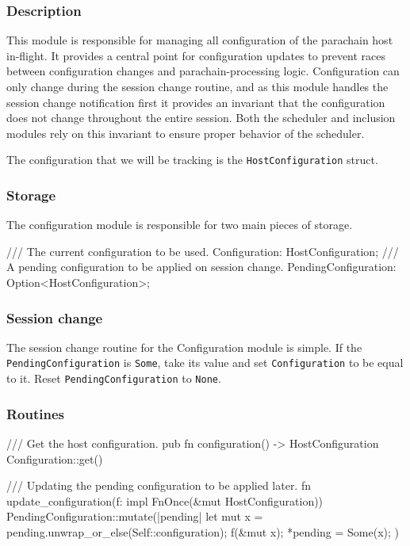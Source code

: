 \subsubsection{Description}

This module is responsible for managing all configuration of the parachain host
in-flight. It provides a central point for configuration updates to prevent
races between configuration changes and parachain-processing logic.
Configuration can only change during the session change routine, and as this
module handles the session change notification first it provides an invariant
that the configuration does not change throughout the entire session. Both the
scheduler and inclusion modules rely on this invariant to ensure proper behavior
of the scheduler.
\newline

The configuration that we will be tracking is the \verb|HostConfiguration|
struct. 

\subsubsection{Storage}

The configuration module is responsible for two main pieces of storage.

\begin{verbnobox}[\small]
/// The current configuration to be used.
Configuration: HostConfiguration;
/// A pending configuration to be applied on session change.
PendingConfiguration: Option<HostConfiguration>;
\end{verbnobox}

\subsubsection{Session change}

The session change routine for the Configuration module is simple. If the
\verb|PendingConfiguration| is \verb|Some|, take its value and set
\verb|Configuration| to be equal to it. Reset \verb|PendingConfiguration| to
\verb|None|.

\subsubsection{Routines}

\begin{verbnobox}[\small]
/// Get the host configuration.
pub fn configuration() -> HostConfiguration {
  Configuration::get()
}

/// Updating the pending configuration to be applied later.
fn update_configuration(f: impl FnOnce(&mut HostConfiguration)) {
  PendingConfiguration::mutate(|pending| {
    let mut x = pending.unwrap_or_else(Self::configuration);
    f(&mut x);
    *pending = Some(x);
  })
}
\end{verbnobox}

